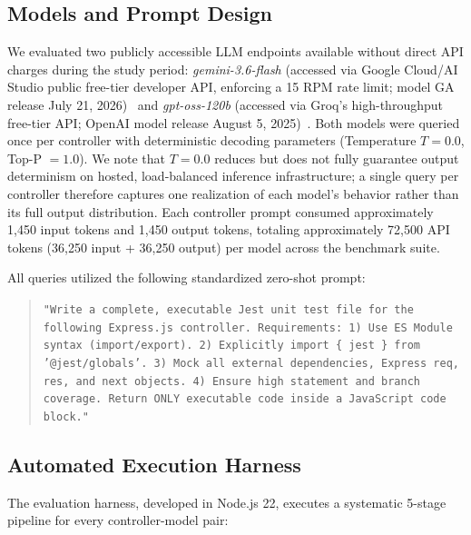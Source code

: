 \documentclass[conference]{IEEEtran}
\begin{document}
\subsection{Models and Prompt Design}

We evaluated two publicly accessible LLM endpoints available without direct API charges during the study period: \textit{gemini-3.6-flash} (accessed via Google Cloud/AI Studio public free-tier developer API, enforcing a 15 RPM rate limit; model GA release July 21, 2026)~\cite{gemini36flashcard} and \textit{gpt-oss-120b} (accessed via Groq's high-throughput free-tier API; OpenAI model release August 5, 2025)~\cite{openaiopts120b}. Both models were queried once per controller with deterministic decoding parameters (Temperature $T = 0.0$, Top-P $= 1.0$). We note that $T=0.0$ reduces but does not fully guarantee output determinism on hosted, load-balanced inference infrastructure; a single query per controller therefore captures one realization of each model's behavior rather than its full output distribution. Each controller prompt consumed approximately 1,450 input tokens and 1,450 output tokens, totaling approximately 72,500 API tokens (36,250 input + 36,250 output) per model across the benchmark suite.

All queries utilized the following standardized zero-shot prompt:

\begin{quote}
\small
\texttt{"Write a complete, executable Jest unit test file for the following Express.js controller. Requirements: 1) Use ES Module syntax (import/export). 2) Explicitly import \{ jest \} from '@jest/globals'. 3) Mock all external dependencies, Express req, res, and next objects. 4) Ensure high statement and branch coverage. Return ONLY executable code inside a JavaScript code block."}
\end{quote}

\subsection{Automated Execution Harness}

The evaluation harness, developed in Node.js 22, executes a systematic 5-stage pipeline for every controller-model pair:
\end{document}
